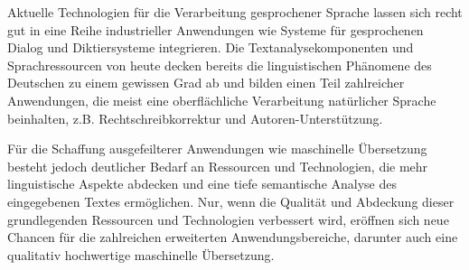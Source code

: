 \documentclass[]{../../metanetpaper}
\begin{document}
\begin{Parallel}[c]{79mm}{78mm}
{Aktuelle Technologien für die Verarbeitung gesprochener Sprache lassen sich recht gut in eine Reihe industrieller Anwendungen wie Systeme für gesprochenen Dialog und Diktiersysteme integrieren. Die Textanalysekomponenten und Sprachressourcen von heute decken bereits die linguistischen Phänomene des Deutschen zu einem gewissen Grad ab und bilden einen Teil zahlreicher Anwendungen, die meist eine oberflächliche Verarbeitung natürlicher Sprache beinhalten, z.B. Rechtschreibkorrektur und Autoren-Unterstützung.

Für die Schaffung ausgefeilterer Anwendungen wie maschinelle Übersetzung besteht jedoch deutlicher Bedarf an Ressourcen und Technologien, die mehr linguistische Aspekte abdecken und eine tiefe semantische Analyse des eingegebenen Textes ermöglichen. Nur, wenn die Qualität und Abdeckung dieser grundlegenden Ressourcen und Technologien verbessert wird, eröffnen sich neue Chancen für die zahlreichen erweiterten Anwendungsbereiche, darunter auch eine qualitativ hochwertige maschinelle Übersetzung. 
 }

\end{Parallel}
\end{document}
